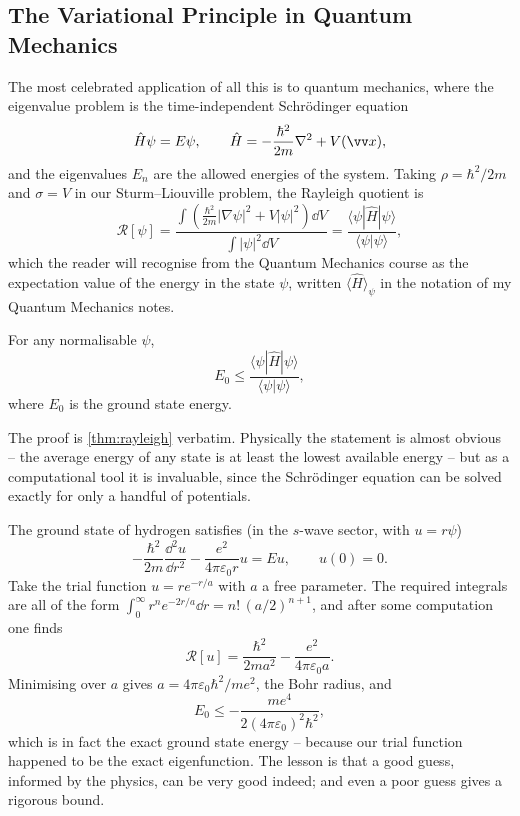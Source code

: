 \subsection{The Variational Principle in Quantum Mechanics}

The most celebrated application of all this is to quantum mechanics, where the eigenvalue problem is the time-independent Schr\"odinger equation
$$
\hat H \psi = E\psi, \qquad \hat H = -\frac{\hbar^2}{2m}\nabla^2 + V(\vv x),
$$
and the eigenvalues $E_n$ are the allowed energies of the system. Taking $\rho = \hbar^2/2m$ and $\sigma = V$ in our Sturm--Liouville problem, the Rayleigh quotient is
$$
\mathcal{R}[\psi] = \frac{\displaystyle\int\left(\frac{\hbar^2}{2m}|\nabla \psi|^2 + V|\psi|^2\right)\dd V}{\displaystyle\int |\psi|^2 \dd V} = \frac{\langle \psi | \hat H | \psi\rangle}{\langle \psi|\psi\rangle},
$$
which the reader will recognise from the Quantum Mechanics course as the expectation value of the energy in the state $\psi$, written $\langle \hat H\rangle_\psi$ in the notation of my Quantum Mechanics notes.

\begin{theorem}
	For any normalisable $\psi$,
	$$
	E_0 \leq \frac{\langle\psi|\hat H|\psi\rangle}{\langle \psi|\psi\rangle},
	$$
	where $E_0$ is the ground state energy.
\end{theorem}

The proof is \autoref{thm:rayleigh} verbatim. Physically the statement is almost obvious -- the average energy of any state is at least the lowest available energy -- but as a computational tool it is invaluable, since the Schr\"odinger equation can be solved exactly for only a handful of potentials.

\begin{example}
	The ground state of hydrogen satisfies (in the $s$-wave sector, with $u = r\psi$)
	$$
	-\frac{\hbar^2}{2m}\frac{\dd^2 u}{\dd r^2} - \frac{e^2}{4\pi\varepsilon_0 r}u = Eu, \qquad u(0) = 0.
	$$
	Take the trial function $u = r e^{-r/a}$ with $a$ a free parameter. The required integrals are all of the form $\int_0^\infty r^n e^{-2r/a}\dd r = n!\,(a/2)^{n+1}$, and after some computation one finds
	$$
	\mathcal{R}[u] = \frac{\hbar^2}{2ma^2} - \frac{e^2}{4\pi\varepsilon_0 a}.
	$$
	Minimising over $a$ gives $a = 4\pi\varepsilon_0\hbar^2/me^2$, the Bohr radius, and
	$$
	E_0 \leq -\frac{m e^4}{2(4\pi\varepsilon_0)^2\hbar^2},
	$$
	which is in fact the exact ground state energy -- because our trial function happened to be the exact eigenfunction. The lesson is that a good guess, informed by the physics, can be very good indeed; and even a poor guess gives a rigorous bound.
\end{example}

